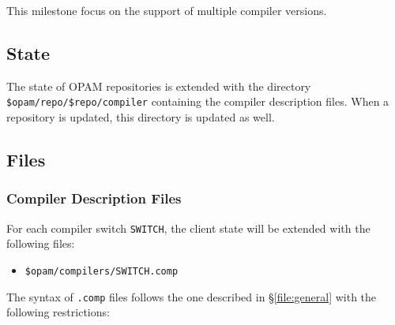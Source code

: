 \documentclass[a4paper,11pt]{article}
\begin{document}
This milestone focus on the support of multiple compiler versions.

\subsection{State}

The state of OPAM repositories is extended with the directory
\verb+$opam/repo/$repo/compiler+ containing the compiler description
files. When a repository is updated, this directory is updated as
well.

\subsection{Files}

\subsubsection{Compiler Description Files}

For each compiler switch {\tt SWITCH}, the client state will be
extended with the following files:

\begin{itemize}
\item {\tt \$opam/compilers/SWITCH.comp}
\end{itemize}

The syntax of {\tt .comp} files follows the one described in
\S\ref{file:general} with the following restrictions:
\end{document}
